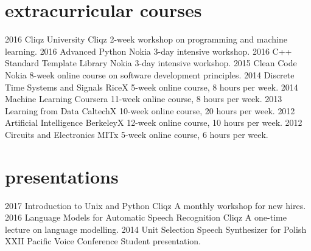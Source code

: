 \documentclass[]{friggeri-cv_osx}
\begin{document}
\section{extracurricular courses}
\begin{entrylist}
\entry
{2016}
{Cliqz University}
{Cliqz}
{2-week workshop on programming and machine learning.}
\entry
{2016}
{Advanced Python}
{Nokia}
{3-day intensive workshop.}
\entry
{2016}
{C++ Standard Template Library}
{Nokia}
{3-day intensive workshop.}
\entry
{2015}
{Clean Code}
{Nokia}
{8-week online course on software development principles.}
\entry
{2014}
{Discrete Time Systems and Signals}
{RiceX}
{5-week online course, 8 hours per week.}
\entry
{2014}
{Machine Learning}
{Coursera}
{11-week online course, 8 hours per week.}
\entry
{2013}
{Learning from Data}
{CaltechX}
{10-week online course, 20 hours per week.}
\entry
{2012}
{Artificial Intelligence}
{BerkeleyX}
{12-week online course, 10 hours per week.}
\entry
{2012}
{Circuits and Electronics}
{MITx}
{5-week online course, 6 hours per week.}
\end{entrylist}


\section{presentations}
\begin{entrylist}
\entry
{2017}
{Introduction to Unix and Python}
{Cliqz}
{A monthly workshop for new hires.}
\entry
{2016}
{Language Models for Automatic Speech Recognition}
{Cliqz}
{A one-time lecture on language modelling.}
\entry
{2014}
{Unit Selection Speech Synthesizer for Polish}
{XXII Pacific Voice Conference}
{Student presentation.}
\end{entrylist}
\end{document}
